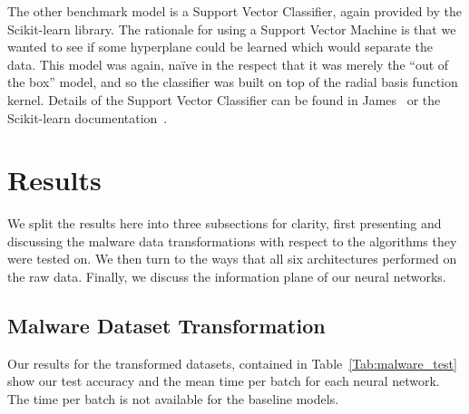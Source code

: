 The other benchmark model is a Support Vector Classifier, again provided by the Scikit-learn library.
The rationale for using a Support Vector Machine is that we wanted to see if some hyperplane could be learned which would separate the data.
This model was again, na\"ive in the respect that it was merely the ``out of the box'' model, and so the classifier was built on top of the radial basis function kernel.
Details of the Support Vector Classifier can be found in James~\cite{james14introduction} or the Scikit-learn documentation~\cite{scikit-learn}.


\section{Results} \label{malware results}
We split the results here into three subsections for clarity, first presenting and discussing the malware data transformations with respect to the algorithms they were tested on. 
We then turn to the ways that all six architectures performed on the raw data.
Finally, we discuss the information plane of our neural networks.

\subsection{Malware Dataset Transformation}
Our results for the transformed datasets, contained in Table~\ref{Tab:malware_test} show our test accuracy and the mean time per batch for each neural network.
The time per batch is not available for the baseline models.

